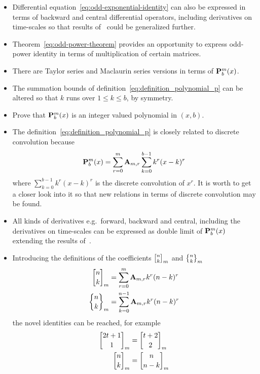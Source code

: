 \begin{itemize}
    \item Differential equation~\eqref{eq:odd-exponential-identity} can also be expressed in terms of backward
    and central differential operators, including derivatives on time-scales so that results of~\cite{kolosov2016study}
    could be generalized further.
    \item Theorem~\eqref{eq:odd-power-theorem} provides an opportunity to express odd-power identity
    in terms of multiplication of certain matrices.
    \item There are Taylor series and Maclaurin series versions in terms of ${\mathbf{P}}\sp{m} \sb{b}(x)$.
    \item The summation bounds of definition~\eqref{eq:definition_polynomial_p} can be altered so that
    $k$ runs over $1 \leq k \leq b$, by symmetry.
    \item Prove that ${\mathbf{P}}\sp{m} \sb{b}(x)$ is an integer valued polynomial in $(x,b)$.
    \item The definition~\eqref{eq:definition_polynomial_p} is closely related to discrete convolution because
    \begin{equation*}
        {\mathbf{P}}\sp{m} \sb{b}(x) = \sum_{r=0}^{m} {\mathbf{A}} \sb{m,r} \sum_{k=0}^{b-1} k^r(x-k)^r
    \end{equation*}
    where $\sum_{k=0}^{b-1} k^r(x-k)^r$ is the discrete convolution of $x^r$.
    It is worth to get a closer look into it so that new relations in terms of discrete convolution may be found.
    \item All kinds of derivatives e.g.\ forward, backward and central, including the derivatives on time-scales can be expressed
    as double limit of ${\mathbf{P}}\sp{m} \sb{b}(x)$ extending the results of~\cite{kolosov_2024_10575485}.
    \item Introducing the definitions of  the coefficients
    ${n \brack k}_{m}$ and ${n \brace k}_{m}$
    \begin{align*}
        {n \brack k}_{m} &= \sum_{r=0}^{m} {\mathbf{A}} \sb{m,r} k^r (n-k)^r \\
        {n \brace k}_{m} &= \sum_{k=0}^{n-1} {\mathbf{A}} \sb{m,r} k^r (n-k)^r
    \end{align*}
    the novel identities can be reached, for example
    \begin{align*}
        \brackCoefficient{2t+1}{1}{m} &= \brackCoefficient{t+2}{2}{m} \\
        \brackCoefficient{n}{k}{m} &= \brackCoefficient{n}{n-k}{m} \\

\end{align*}
\end{itemize}
